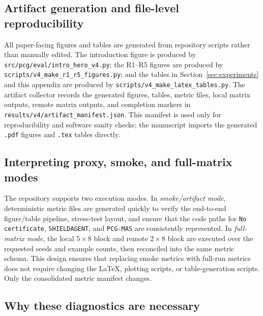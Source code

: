 

\subsection{Artifact generation and file-level reproducibility}
\label{appendix:exp_details:artifacts}

All paper-facing figures and tables are generated from repository scripts rather than manually
edited. The introduction figure is produced by \texttt{src/pcg/eval/intro\_hero\_v4.py}; the R1--R5
figures are produced by \texttt{scripts/v4\_make\_r1\_r5\_figures.py}; and the tables in
Section~\ref{sec:experiments} and this appendix are produced by
\texttt{scripts/v4\_make\_latex\_tables.py}. The artifact collector records the generated figures,
tables, metric files, local matrix outputs, remote matrix outputs, and completion markers in
\texttt{results/v4/artifact\_manifest.json}. This manifest is used only for reproducibility and
software sanity checks; the manuscript imports the generated \texttt{.pdf} figures and
\texttt{.tex} tables directly.

\subsection{Interpreting proxy, smoke, and full-matrix modes}
\label{appendix:exp_details:modes}

The repository supports two execution modes. In \emph{smoke/artifact mode}, deterministic metric
files are generated quickly to verify the end-to-end figure/table pipeline, stress-test layout, and
ensure that the code paths for \texttt{No certificate}, \texttt{SHIELDAGENT}, and \texttt{PCG-MAS}
are consistently represented. In \emph{full-matrix mode}, the local \(5\times8\) block and remote
\(2\times8\) block are executed over the requested seeds and example counts, then reconciled into the
same metric schema. This design ensures that replacing smoke metrics with full-run metrics does not
require changing the LaTeX, plotting scripts, or table-generation scripts. Only the consolidated
metric manifest changes.

\subsection{Why these diagnostics are necessary}
\label{appendix:exp_details:diagnostic_rationale}

